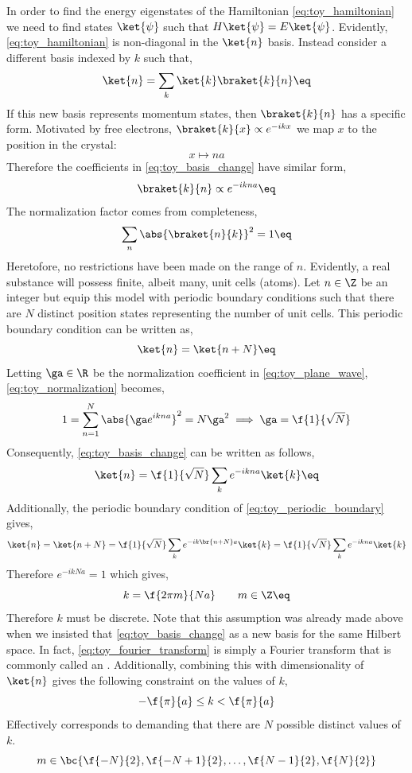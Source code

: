 \documentclass{article}
\begin{document}
In order to find the energy eigenstates of the Hamiltonian \cref{eq:toy_hamiltonian} we need to find states $\ket{\psi}$ such that $H \ket{\psi} = E \ket{\psi}$. Evidently, \cref{eq:toy_hamiltonian} is non-diagonal in the $\ket{n}$ basis. Instead consider a different basis indexed by $k$ such that,
\[ \ket{n} = \sum_{k} \ket{k}\braket{k}{n} \eq \label{eq:toy_basis_change}\]
If this new basis represents momentum states, then $\braket{k}{n}$ has a specific form. Motivated by free electrons, $\braket{k}{x} \propto e^{-ikx}$ we map $x$ to the position in the crystal:
\[ x \mapsto na \]
Therefore the coefficients in \cref{eq:toy_basis_change} have similar form,
\[ \braket{k}{n} \propto e^{- ikna} \eq \label{eq:toy_plane_wave}\]
The normalization factor comes from completeness,
\[ \sum_{n} \abs{\braket{n}{k}}^2 = 1 \eq \label{eq:toy_normalization}\]
Heretofore, no restrictions have been made on the range of $n$. Evidently, a real substance will possess finite, albeit many, unit cells (atoms). Let $n \in \Z$ be an integer but equip this model with periodic boundary conditions such that there are $N$ distinct position states representing the number of unit cells. This periodic boundary condition can be written as,
\[ \ket{n} = \ket{n + N} \eq \label{eq:toy_periodic_boundary}\]
Letting $\ga \in \R$ be the normalization coefficient in \cref{eq:toy_plane_wave}, \cref{eq:toy_normalization} becomes,
\[ 1 = \sum_{n=1}^{N} \abs{\ga e^{ikna}}^2 = N \ga^2 \implies \ga = \f{1}{\sqrt{N}}\]
Consequently, \cref{eq:toy_basis_change} can be written as follows,
\[ \ket{n} = \f{1}{\sqrt{N}} \sum_{k} e^{- ikna} \ket{k} \eq \label{eq:toy_fourier_transform} \]
Additionally, the periodic boundary condition of \cref{eq:toy_periodic_boundary} gives,
\[  \ket{n} =\ket{n+N} = \f{1}{\sqrt{N}} \sum_{k} e^{- ik\br{n+N}a} \ket{k} = \f{1}{\sqrt{N}} \sum_{k} e^{- ikna} \ket{k}  \]
Therefore $e^{- ikNa} = 1$ which gives,
\[ k = \f{2\pi m}{Na} \qquad m \in \Z \eq \label{eq:toy_k_discrete}\]
Therefore $k$ must be discrete. Note that this assumption was already made above when we insisted that \cref{eq:toy_basis_change} as a new basis for the same Hilbert space. In fact, \cref{eq:toy_fourier_transform} is simply a Fourier transform that is commonly called an . Additionally, combining this with dimensionality of $\ket{n}$ gives the following constraint on the values of $k$,
\[ -\f{\pi}{a} \leq k < \f{\pi}{a} \]
Effectively corresponds to demanding that there are $N$ possible distinct values of $k$.
\[ m \in \bc{ \f{-N}{2},  \f{-N+1}{2},\ldots,  \f{N-1}{2}, \f{N}{2} } \]
\end{document}
